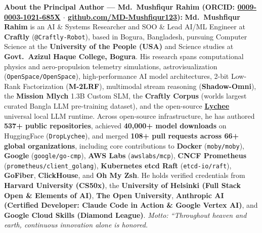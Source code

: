 \documentclass[11pt,letterpaper]{article}
\newcommand{\takeaway}[2]{%
  \vspace{6pt}%
  \noindent\colorbox{boxbg}{%
    \parbox{\dimexpr\textwidth-2\fboxsep\relax}{%
      \vspace{5pt}\textbf{\color{primary}#1:}\hspace{0.4em}#2\vspace{5pt}%
    }%
  }%
  \vspace{6pt}%
}
\begin{document}
\takeaway{About the Principal Author --- Md.\ Mushfiqur Rahim (ORCID: \href{https://orcid.org/0009-0003-1021-685X}{0009-0003-1021-685X} $\cdot$ \href{https://github.com/MD-Mushfiqur123}{github.com/MD-Mushfiqur123})}{%
\textbf{Md.\ Mushfiqur Rahim} is an AI \& Systems Researcher and SOO \& Lead AI/ML Engineer at \textbf{Craftly} (\texttt{@Craftly-Robot}), based in Bogura, Bangladesh, pursuing Computer Science at the \textbf{University of the People (USA)} and Science studies at \textbf{Govt.\ Azizul Haque College, Bogura}. His research spans computational physics and aero-propulsion telemetry simulations, astrovisualization (\texttt{OpenSpace/OpenSpace}), high-performance AI model architectures, 2-bit Low-Rank Factorization (\textbf{M-2LRF}), multimodal stream reasoning (\textbf{Shadow-Omni}), the \textbf{Mission Mlych} 1.3B Custom SLM, the \textbf{Craftly Corpus} (world\textquotesingle s largest curated Bangla LLM pre-training dataset), and the open-source \href{https://github.com/MD-Mushfiqur123/lychee}{\textbf{Lychee}} universal local LLM runtime. Across open-source infrastructure, he has authored \textbf{537+ public repositories}, achieved \textbf{40,000+ model downloads} on HuggingFace (\texttt{DropLychee}), and merged \textbf{108+ pull requests across 66+ global organizations}, including core contributions to \textbf{Docker} (\texttt{moby/moby}), \textbf{Google} (\texttt{google/go-cmp}), \textbf{AWS Labs} (\texttt{awslabs/mcp}), \textbf{CNCF Prometheus} (\texttt{prometheus/client\_golang}), \textbf{Kubernetes etcd Raft} (\texttt{etcd-io/raft}), \textbf{GoFiber}, \textbf{ClickHouse}, and \textbf{Oh My Zsh}. He holds verified credentials from \textbf{Harvard University (CS50x)}, the \textbf{University of Helsinki (Full Stack Open \& Elements of AI)}, \textbf{The Open University}, \textbf{Anthropic AI (Certified Developer: Claude Code in Action \& Google Vertex AI)}, and \textbf{Google Cloud Skills (Diamond League)}. \emph{Motto: ``Throughout heaven and earth, continuous innovation alone is honored.}
}
\end{document}
